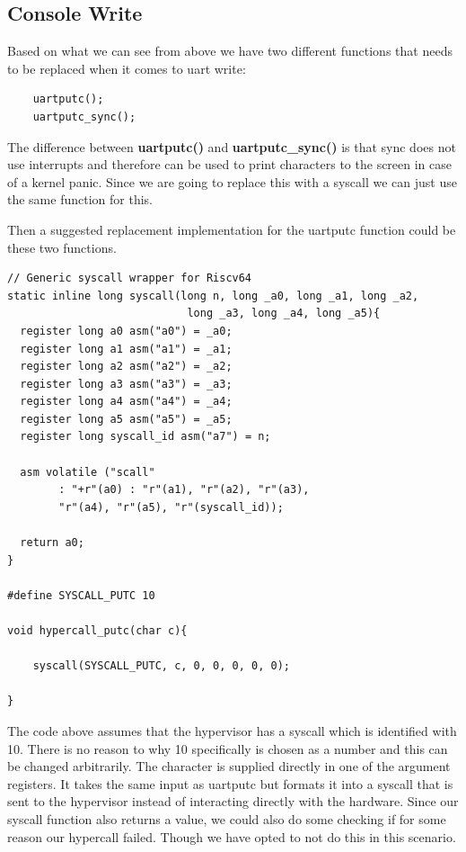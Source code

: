 \subsection{Console Write}
\label{imp:console-write}

Based on what we can see from above we have two different functions that needs to be replaced when it comes to uart write:
\begin{verbatim}
    uartputc();
    uartputc_sync();
\end{verbatim}

The difference between \textbf{uartputc()} and \textbf{uartputc\_sync()} is that sync does not use interrupts and therefore can be used to print characters to the screen in case of a kernel panic. Since we are going to replace this with a syscall we can just use the same function for this.

Then a suggested replacement implementation for the uartputc function could be these two functions.

\begin{verbatim}
// Generic syscall wrapper for Riscv64
static inline long syscall(long n, long _a0, long _a1, long _a2, 
                            long _a3, long _a4, long _a5){
  register long a0 asm("a0") = _a0;
  register long a1 asm("a1") = _a1;
  register long a2 asm("a2") = _a2;
  register long a3 asm("a3") = _a3;
  register long a4 asm("a4") = _a4;
  register long a5 asm("a5") = _a5;
  register long syscall_id asm("a7") = n;

  asm volatile ("scall"
		: "+r"(a0) : "r"(a1), "r"(a2), "r"(a3), 
        "r"(a4), "r"(a5), "r"(syscall_id));

  return a0;
}

#define SYSCALL_PUTC 10

void hypercall_putc(char c){

    syscall(SYSCALL_PUTC, c, 0, 0, 0, 0, 0);

}
\end{verbatim}

The code above assumes that the hypervisor has a syscall which is identified with 10. There is no reason to why 10 specifically is chosen as a number and this can be changed arbitrarily. The character is supplied directly in one of the argument registers. It takes the same input as uartputc but formats it into a syscall that is sent to the hypervisor instead of interacting directly with the hardware. Since our syscall function also returns a value, we could also do some checking if for some reason our hypercall failed. Though we have opted to not do this in this scenario.  


